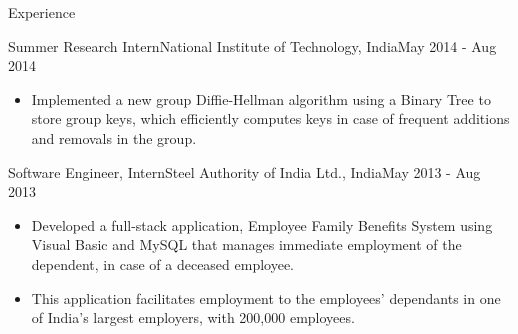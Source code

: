 \documentclass[]{dhruv_misra}
\begin{document}
\begin{cvsection}{Experience}
	    \begin{cvsubsection}{Summer Research Intern}{National Institute of Technology, India}{May 2014 - Aug 2014}
			\begin{itemize}
				\item Implemented a new group Diffie-Hellman algorithm using a Binary Tree to store group keys, which efficiently computes keys in case of frequent additions and removals in the group.
			\end{itemize}
	    \end{cvsubsection}
	    
	    \begin{cvsubsection}{Software Engineer, Intern}{Steel Authority of India Ltd., India}{May 2013 - Aug 2013}
			\begin{itemize}
				\item  Developed a full-stack application, Employee Family Benefits System using Visual Basic and MySQL that manages immediate employment of the dependent, in case of a deceased employee. 
				\item This application facilitates employment to the employees' dependants in one of India's largest employers, with 200,000 employees.
			\end{itemize}
	    \end{cvsubsection}
	\end{cvsection}
	
\end{document}
